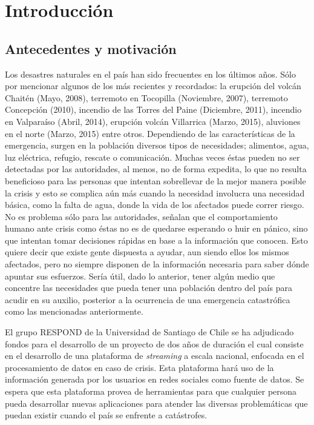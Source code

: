\chapter{Introducción}
\label{cap:introduccion}

\section{Antecedentes y motivación}
\label{intro:motivacion}

Los desastres naturales en el país han sido frecuentes en los últimos años. Sólo por mencionar algunos de los más recientes y recordados: la erupción del volcán Chaitén (Mayo, 2008), terremoto en Tocopilla (Noviembre, 2007), terremoto Concepción (2010), incendio de las Torres del Paine (Diciembre, 2011), incendio en Valparaíso (Abril, 2014), erupción volcán Villarrica (Marzo, 2015), aluviones en el norte (Marzo, 2015) entre otros. Dependiendo de las características de la emergencia, surgen en la población diversos tipos de necesidades; alimentos, agua, luz eléctrica, refugio, rescate o comunicación. Muchas veces éstas pueden no ser detectadas por las autoridades, al menos, no de forma expedita, lo que no resulta beneficioso para las personas que intentan sobrellevar de la mejor manera posible la crisis y esto se complica aún más cuando la necesidad involucra una necesidad básica, como la falta de agua, donde la vida de los afectados puede correr riesgo. No es problema sólo para las autoridades, \cite{ChatoSurvey} señalan que el comportamiento humano ante crisis como éstas no es de quedarse esperando o huir en pánico, sino que intentan tomar decisiones rápidas en base a la información que conocen. Esto quiere decir que existe gente dispuesta a ayudar, aun siendo ellos los mismos afectados, pero no siempre disponen de la información necesaria para saber dónde apuntar sus esfuerzos. Sería útil, dado lo anterior, tener algún medio que concentre las necesidades que pueda tener una población dentro del país para acudir en su auxilio, posterior a la ocurrencia de una emergencia catastrófica como las mencionadas anteriormente.

El grupo RESPOND de la Universidad de Santiago de Chile se ha adjudicado fondos para el desarrollo de un proyecto de dos años de duración el cual consiste en el desarrollo de una plataforma de \textit{streaming} a escala nacional, enfocada en el procesamiento de datos en caso de crisis. Esta plataforma hará uso de la información generada por los usuarios en redes sociales como fuente de datos. Se espera que esta plataforma provea de herramientas para que cualquier persona pueda desarrollar nuevas aplicaciones para atender las diversas problemáticas que puedan existir cuando el país se enfrente a catástrofes.

